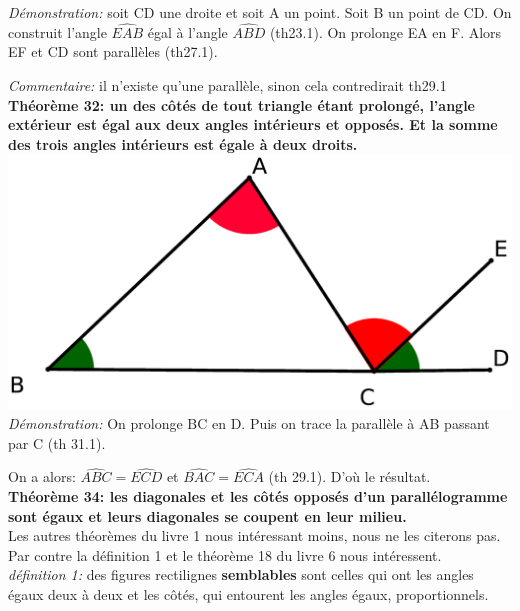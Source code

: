 \documentclass[a4paper, 12pt, twoside]{book}
\begin{document}
 \textit{Démonstration:} soit CD une droite et soit A un point. Soit B un point de CD. On construit l'angle $\hat{EAB}$ égal à l'angle $\hat{ABD}$ (th23.1). On prolonge EA en F. Alors EF et CD sont parallèles (th27.1).\
 
 \textit{Commentaire:} il n'existe qu'une parallèle, sinon cela contredirait th29.1\\
 
 \textbf{Théorème 32: un des côtés de tout triangle étant prolongé, l'angle extérieur est égal aux deux angles intérieurs et opposés. Et la somme des trois angles intérieurs est égale à deux droits.}\\
 
 
 \includegraphics[scale=0.2]{figures/th32.eps} \\ 
 
 \textit{Démonstration:} On prolonge BC en D. Puis on trace la parallèle à AB passant par C (th 31.1).\
 
 On a alors: $\hat{ABC}=\hat{ECD}$ et  $\hat{BAC}=\hat{ECA}$ (th 29.1). D'où le résultat.\\
 
 \textbf{Théorème 34: les diagonales et les côtés opposés d'un parallélogramme sont égaux et leurs diagonales se coupent en leur milieu.}\\
 
 
  
 Les autres théorèmes du livre 1 nous intéressant moins, nous ne les citerons pas. Par contre la définition 1 et le théorème 18 du livre 6 nous intéressent.\\
 
 
 
  \textit{définition 1:} des figures rectilignes \textbf{semblables} sont celles qui ont les angles égaux deux à deux et les côtés, qui entourent les angles égaux, proportionnels.\\
 
\end{document}
